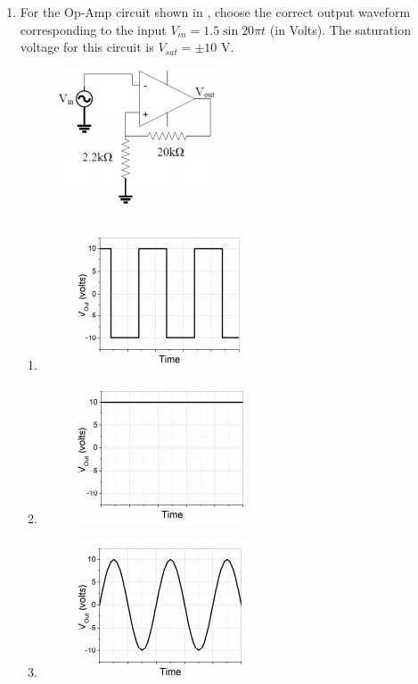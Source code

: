 \documentclass[journal,12pt,onecolumn]{IEEEtran}
\theoremstyle{remark}
\begin{document}
\begin{enumerate}
\newpage

\item
For the Op-Amp circuit shown in , choose the correct output waveform corresponding to the input $V_{in} = 1.5 \sin 20\pi t$ (in Volts). The saturation voltage for this circuit is $V_{sat} = \pm 10$ V.
\begin{center}
    \begin{figure}[H] \caption{} \label{fig:11}\includegraphics{figs/11.png}\end{figure}%
\end{center}
\begin{enumerate}
    \item \begin{figure}[H] \caption*{} \label{fig:11a}\includegraphics{figs/11a.png}\end{figure}%
    \item \begin{figure}[H] \caption*{} \label{fig:11b}\includegraphics{figs/11b.png}\end{figure}%
    \item \begin{figure}[H] \caption*{} \label{fig:11c}\includegraphics{figs/11c.png}\end{figure}%

\end{enumerate}
\end{enumerate}
\end{document}

